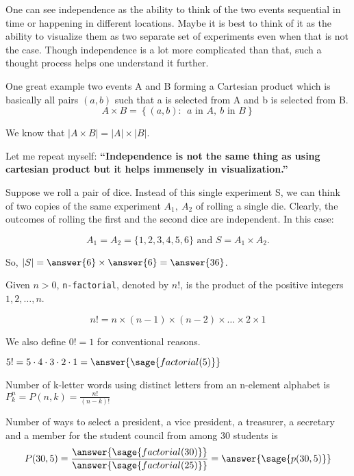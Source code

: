 \documentclass{ximera}
\begin{document}
\begin{remark}
One can see independence as the ability to think of the two events sequential in time or happening in different locations. Maybe it is best to think of it as the ability to visualize them as two separate set of experiments even when that is not the case. Though independence is a lot more complicated than that, such a thought process helps one understand it further.

One great example two events A and B forming a Cartesian product which is basically all pairs $(a,b)$ such that a is selected from A and b is selected from B.
$$A\times B=\left\{ (a,b):~~ a \text{ in } A,~ b \text{ in } B \right\}$$

We know that $|A\times B|=|A|\times |B|$. 

Let me repeat myself: \textbf{``Independence is not the same thing as using cartesian product but it helps immensely in visualization.''}
\end{remark}


\begin{example}
Suppose we roll a pair of dice. Instead of this single experiment S, we can think of two copies of the same experiment $A_1,~A_2$ of rolling a single die. Clearly, the outcomes of rolling the first and the second dice are independent. In this case:

$$A_1=A_2=\{1,2,3,4,5,6\} \text{ and } S=A_1\times A_2.$$

So, $|S|=\answer{6}\times \answer{6}=\answer{36}$.
\end{example}

\begin{definition}[Factorial]
Given $n>0$, \verb!n-factorial!, denoted by $n!$, is the product of the positive integers $1,2,\ldots, n$.

$$n!=n\times (n-1) \times (n-2) \times \ldots \times 2\times 1$$

We also define $0!=1$ for conventional reasons.
\end{definition}

\begin{example}
$5!=5\cdot 4 \cdot 3 \cdot 2 \cdot 1=\answer{\sage{factorial(5)}}$
\end{example}
\begin{theorem}
Number of k-letter words using distinct letters from an n-element alphabet is $P_k^n=P(n,k)=\frac{n!}{(n-k)!}$
\end{theorem}

\begin{example}
Number of ways to select a president, a vice president, a treasurer, a secretary and a member for the student council from among 30 students is  
$$
P(30,5)
=
\frac{\answer{\sage{factorial(30)}}}{\answer{\sage{factorial(25)}}}
=
\answer{\sage{p(30,5)}}
$$ 
\end{example}
\end{document}
